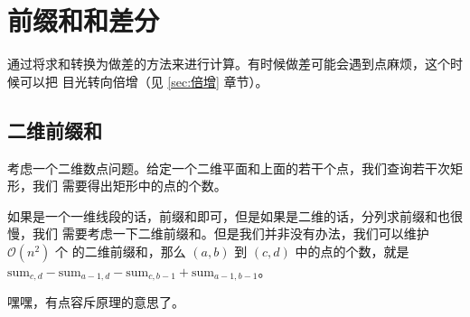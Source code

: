 \section{前缀和和差分} \label{sec:前缀和和差分}
通过将求和转换为做差的方法来进行计算。有时候做差可能会遇到点麻烦，这个时候可以把
目光转向倍增（见 \ref{sec:倍增} 章节）。

\subsection{二维前缀和}
考虑一个二维数点问题。给定一个二维平面和上面的若干个点，我们查询若干次矩形，我们
需要得出矩形中的点的个数。

如果是一个一维线段的话，前缀和即可，但是如果是二维的话，分列求前缀和也很慢，我们
需要考虑一下二维前缀和。但是我们并非没有办法，我们可以维护 $\mathcal{O}(n^2)$ 个
的二维前缀和，那么 $(a, b)$ 到 $(c, d)$ 中的点的个数，就是 $\mathrm{sum}_{c,d} -
\mathrm{sum}_{a-1,d} - \mathrm{sum}_{c,b-1} + \mathrm{sum}_{a-1,b-1}$。

嘿嘿，有点容斥原理的意思了。
